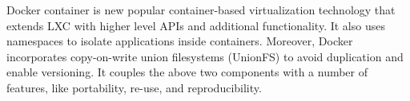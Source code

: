 Docker container is new popular container-based virtualization technology that extends LXC with higher level APIs and additional functionality. It also uses namespaces to isolate applications inside containers. Moreover, Docker incorporates copy-on-write union filesystems (UnionFS) to avoid duplication and enable versioning. It couples the above two components with a number of features, like portability, re-use, and reproducibility.



 


 
 

